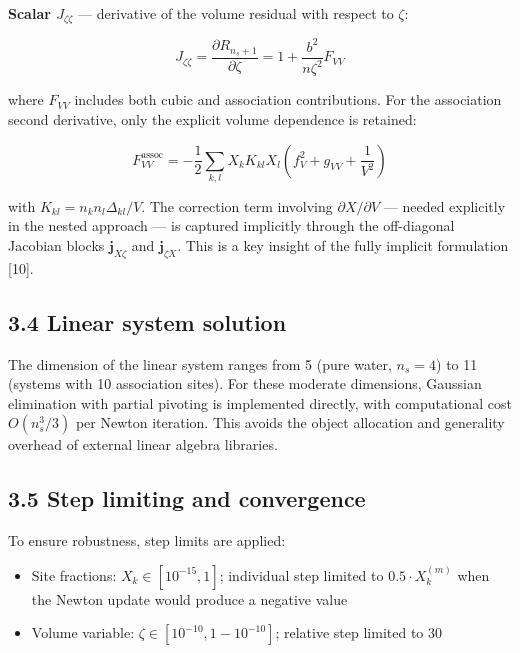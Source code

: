 \documentclass[review,3p]{elsarticle}
\begin{document}
\textbf{Scalar $J_{\zeta\zeta}$} — derivative of the volume residual with respect to $\zeta$:

\begin{equation}

J_{\zeta\zeta} = \frac{\partial R_{n_s+1}}{\partial \zeta} = 1 + \frac{b^2}{n\zeta^2} F_{VV}

\end{equation}

where $F_{VV}$ includes both cubic and association contributions. For the association second derivative, only the explicit volume dependence is retained:

\begin{equation}

F_{VV}^{\text{assoc}} = -\frac{1}{2} \sum_{k,l} X_k K_{kl} X_l \left(f_V^2 + g_{VV} + \frac{1}{V^2}\right)

\end{equation}

with $K_{kl} = n_k n_l \Delta_{kl}/V$. The correction term involving $\partial X / \partial V$ — needed explicitly in the nested approach — is captured implicitly through the off-diagonal Jacobian blocks $\mathbf{j}_{X\zeta}$ and $\mathbf{j}_{\zeta X}$. This is a key insight of the fully implicit formulation [10].

\subsection{3.4 Linear system solution}

The dimension of the linear system ranges from 5 (pure water, $n_s = 4$) to 11 (systems with 10 association sites). For these moderate dimensions, Gaussian elimination with partial pivoting is implemented directly, with computational cost $O(n_s^3/3)$ per Newton iteration. This avoids the object allocation and generality overhead of external linear algebra libraries.

\subsection{3.5 Step limiting and convergence}

To ensure robustness, step limits are applied:

\begin{itemize}
  \item Site fractions: $X_k \in [10^{-15}, 1]$; individual step limited to $0.5 \cdot X_k^{(m)}$ when the Newton update would produce a negative value
  \item Volume variable: $\zeta \in [10^{-10}, 1 - 10^{-10}]$; relative step limited to 30%
\end{itemize}
\end{document}
